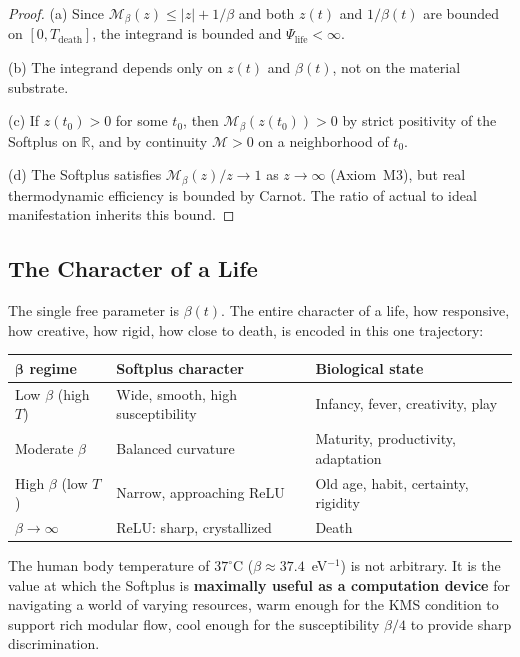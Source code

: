 \documentclass[12pt, letterpaper]{article}
\theoremstyle{plain}
\theoremstyle{definition}
\theoremstyle{remark}
\newcommand{\Mop}{\mathcal{M}}            %
\newcommand{\Real}{\mathbb{R}}
\newcommand{\soul}{\Psi_{\text{life}}}    %
\begin{document}
\begin{proof}
  (a) Since $\Mop_\beta(z) \leq |z| + 1/\beta$ and both $z(t)$ and $1/\beta(t)$ are bounded on $[0, T_{\text{death}}]$, the integrand is bounded and $\soul < \infty$.

  (b) The integrand depends only on $z(t)$ and $\beta(t)$, not on the material substrate.

  (c) If $z(t_0) > 0$ for some $t_0$, then $\Mop_\beta(z(t_0)) > 0$ by strict positivity of the Softplus on $\Real$, and by continuity $\Mop > 0$ on a neighborhood of $t_0$.

  (d) The Softplus satisfies $\Mop_\beta(z)/z \to 1$ as $z \to \infty$ (Axiom~M3), but real thermodynamic efficiency is bounded by Carnot. The ratio of actual to ideal manifestation inherits this bound.
\end{proof}

\subsection{The Character of a Life}

The single free parameter is $\beta(t)$. The entire character of a life, how responsive, how creative, how rigid, how close to death, is encoded in this one trajectory:

\begin{center}
\renewcommand{\arraystretch}{1.35}
\small
\begin{tabular}{@{}lp{4.5cm}l@{}}
\toprule
$\boldsymbol{\beta}$ \textbf{regime} & \textbf{Softplus character} & \textbf{Biological state} \\
\midrule
Low $\beta$ (high $T$) & Wide, smooth, high susceptibility & Infancy, fever, creativity, play \\
Moderate $\beta$        & Balanced curvature                & Maturity, productivity, adaptation \\
High $\beta$ (low $T$)  & Narrow, approaching ReLU          & Old age, habit, certainty, rigidity \\
$\beta \to \infty$      & ReLU: sharp, crystallized          & Death \\
\bottomrule
\end{tabular}
\end{center}

\medskip
\noindent
The human body temperature of $37^\circ$C ($\beta \approx 37.4$~eV$^{-1}$) is not arbitrary. It is the value at which the Softplus is \textbf{maximally useful as a computation device} for navigating a world of varying resources, warm enough for the KMS condition to support rich modular flow, cool enough for the susceptibility $\beta/4$ to provide sharp discrimination.
\end{document}
